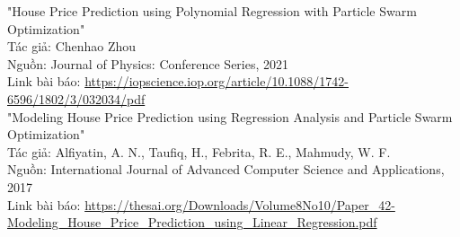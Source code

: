 \noindent "House Price Prediction using Polynomial Regression with Particle Swarm Optimization"\\
Tác giả: Chenhao Zhou\\
Nguồn: Journal of Physics: Conference Series, 2021\\
Link bài báo: \url{https://iopscience.iop.org/article/10.1088/1742-6596/1802/3/032034/pdf}\\

\noindent "Modeling House Price Prediction using Regression Analysis and Particle Swarm Optimization"\\
Tác giả: Alfiyatin, A. N., Taufiq, H., Febrita, R. E., Mahmudy, W. F.\\
Nguồn: International Journal of Advanced Computer Science and Applications, 2017\\
Link bài báo: \url{https://thesai.org/Downloads/Volume8No10/Paper_42-Modeling_House_Price_Prediction_using_Linear_Regression.pdf}
